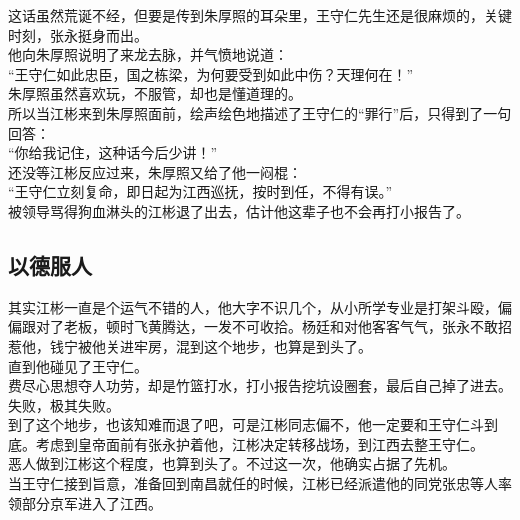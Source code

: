\begin{multicols}{\theparacolNo}
这话虽然荒诞不经，但要是传到朱厚照的耳朵里，王守仁先生还是很麻烦的，关键时刻，张永挺身而出。\\

他向朱厚照说明了来龙去脉，并气愤地说道：\\

“王守仁如此忠臣，国之栋梁，为何要受到如此中伤？天理何在！”\\

朱厚照虽然喜欢玩，不服管，却也是懂道理的。\\

所以当江彬来到朱厚照面前，绘声绘色地描述了王守仁的“罪行”后，只得到了一句回答：\\

“你给我记住，这种话今后少讲！”\\

还没等江彬反应过来，朱厚照又给了他一闷棍：\\

“王守仁立刻复命，即日起为江西巡抚，按时到任，不得有误。”\\

被领导骂得狗血淋头的江彬退了出去，估计他这辈子也不会再打小报告了。\\

\subsection{以德服人}
其实江彬一直是个运气不错的人，他大字不识几个，从小所学专业是打架斗殴，偏偏跟对了老板，顿时飞黄腾达，一发不可收拾。杨廷和对他客客气气，张永不敢招惹他，钱宁被他关进牢房，混到这个地步，也算是到头了。\\

直到他碰见了王守仁。\\

费尽心思想夺人功劳，却是竹篮打水，打小报告挖坑设圈套，最后自己掉了进去。\\

失败，极其失败。\\

到了这个地步，也该知难而退了吧，可是江彬同志偏不，他一定要和王守仁斗到底。考虑到皇帝面前有张永护着他，江彬决定转移战场，到江西去整王守仁。\\

恶人做到江彬这个程度，也算到头了。不过这一次，他确实占据了先机。\\

当王守仁接到旨意，准备回到南昌就任的时候，江彬已经派遣他的同党张忠等人率领部分京军进入了江西。\\


\end{multicols}
